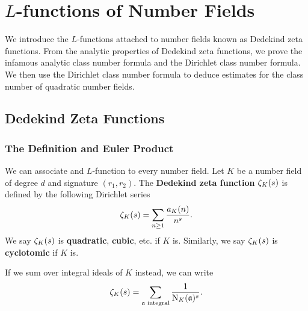 \chapter{\texorpdfstring{$L$}{L}-functions of Number Fields}
  We introduce the $L$-functions attached to number fields known as Dedekind zeta functions. From the analytic properties of Dedekind zeta functions, we prove the infamous analytic class number formula and the Dirichlet class number formula. We then use the Dirichlet class number formula to deduce estimates for the class number of quadratic number fields.
  \section{Dedekind Zeta Functions}
    \subsection*{The Definition and Euler Product}
      We can associate and $L$-function to every number field. Let $K$ be a number field of degree $d$ and signature $(r_{1},r_{2})$. The \textbf{Dedekind zeta function} $\zeta_{K}(s)$ is defined by the following Dirichlet series
      \[
        \zeta_{K}(s) = \sum_{n \ge 1}\frac{a_{K}(n)}{n^{s}}.
      \]
      We say $\zeta_{K}(s)$ is \textbf{quadratic}, \textbf{cubic}, etc. if $K$ is. Similarly, we say $\zeta_{K}(s)$ is \textbf{cyclotomic} if $K$ is.

      \begin{remark}\label{rem:alternative_expression_for_Dirichlet_series_of_Dedekind_zeta_function}
        If we sum over integral ideals of $K$ instead, we can write
        \[
          \zeta_{K}(s) = \sum_{\text{$\mathfrak{a}$ integral}}\frac{1}{\operatorname{\mathrm{N}}_{K}(\mathfrak{a})^{s}}.
        \]
      \end{remark}

